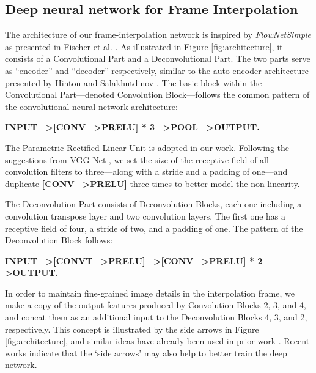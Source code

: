 \documentclass[runningheads]{llncs}
\begin{document}
	\subsection{Deep neural network for Frame Interpolation}	
	\label{sec:architecture}	
		
	The architecture of our frame-interpolation network is inspired by \textit{FlowNetSimple} as presented in Fischer et al. \cite{fischer2015flownet}. As illustrated in Figure \ref{fig:architecture}, it consists of a Convolutional Part and a Deconvolutional Part. The two parts serve as ``encoder'' and ``decoder'' respectively, similar to the auto-encoder architecture presented by Hinton and Salakhutdinov \cite{hinton2006reducing}. The basic block within the Convolutional Part---denoted Convolution Block---follows the common pattern of the convolutional neural network architecture: 
		\begin{spacing}{1.3}
		\centerline{\fontsize{7}{10}\textbf{INPUT --\textgreater [CONV --\textgreater PRELU] * 3 --\textgreater POOL --\textgreater OUTPUT.}}
		\end{spacing}
        \noindent The Parametric Rectified Linear Unit \cite{he2015delving} is adopted in our work. Following the suggestions from VGG-Net \cite{chatfield2014return}, we set the size of the receptive field of all convolution filters to three---along with a stride and a padding of one---and duplicate {\fontsize{7}{10}\textbf{[CONV --\textgreater PRELU]}} three times to better model the non-linearity. 
		
		The Deconvolution Part consists of Deconvolution Blocks, each one including a convolution transpose layer \cite{vedaldi2014matconvnet} and two convolution layers. The first one has a receptive field of four, a stride of two, and a padding of one. The pattern of the Deconvolution Block follows:
		\begin{spacing}{1.3}
		\centerline{\fontsize{7}{10}\textbf{INPUT --\textgreater [CONVT --\textgreater PRELU] --\textgreater [CONV --\textgreater PRELU] * 2 --\textgreater OUTPUT.}}
		\end{spacing}
		\noindent In order to maintain fine-grained image details in the interpolation frame, we make a copy of the output features produced by Convolution Blocks 2, 3, and 4, and concat them as an additional input to the Deconvolution Blocks 4, 3, and 2, respectively. This concept is illustrated by the side arrows in Figure \ref{fig:architecture}, and similar ideas have already been used in prior work \cite{fischer2015flownet,eigen2014depth}. Recent works \cite{srivastava2015highway,he2015deep} indicate that the `side arrows' may also help to better train the deep network.
		
\end{document}
